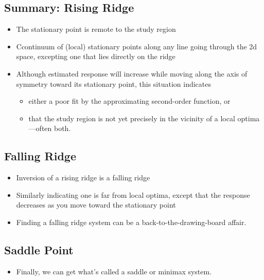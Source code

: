 \documentclass[
  letterpaper,
  DIV=11,
  numbers=noendperiod]{scrreprt}
\providecommand{\tightlist}{%
  \setlength{\itemsep}{0pt}\setlength{\parskip}{0pt}}\usepackage{longtable,booktabs,array}
\begin{document}
\subsection{Summary: Rising Ridge}\label{summary-rising-ridge}

\begin{itemize}
\tightlist
\item
  The stationary point is remote to the study region
\item
  Ccontinuum of (local) stationary points along any line going through
  the 2d space, excepting one that lies directly on the ridge
\item
  Although estimated response will increase while moving along the axis
  of symmetry toward its stationary point, this situation indicates

  \begin{itemize}
  \tightlist
  \item
    either a poor fit by the approximating second-order function, or
  \item
    that the study region is not yet precisely in the vicinity of a
    local optima---often both.
  \end{itemize}
\end{itemize}

\subsection{Falling Ridge}\label{falling-ridge}

\begin{itemize}
\tightlist
\item
  Inversion of a rising ridge is a falling ridge
\item
  Similarly indicating one is far from local optima, except that the
  response decreases as you move toward the stationary point
\item
  Finding a falling ridge system can be a back-to-the-drawing-board
  affair.
\end{itemize}

\subsection{Saddle Point}\label{saddle-point}

\begin{itemize}
\tightlist
\item
  Finally, we can get what's called a saddle or minimax system.
\end{itemize}
\end{document}
